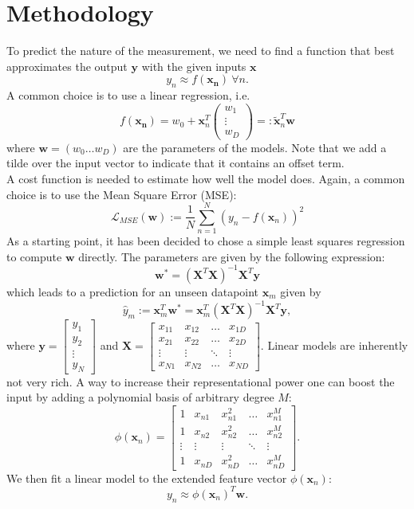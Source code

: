\documentclass[10pt,conference,compsocconf]{IEEEtran}
\newcommand{\xx}{\mathbf{x}}
\newcommand{\yy}{\mathbf{y}}
\newcommand{\ww}{\mathbf{w}}
\newcommand{\XX}{\mathbf{X}}
\newcommand{\Lagr}{\mathcal{L}}
\newcommand{\Lmse}{\Lagr_{MSE}}
\begin{document}
\section{Methodology}
To predict the nature of the measurement, we need to find a function that best approximates the output $\yy$ with the given inputs $\xx$
$$
y_n \approx f(\mathbf{x_n}) \ \forall n.
$$
A common choice is to use a linear regression, i.e.
$$
f(\mathbf{x_n}) = w_0 +  \xx_n^T\begin{pmatrix} w_1 \\ \vdots\\ w_D \end{pmatrix} =: \tilde{\xx}_n^T \ww
$$
where $\ww = (w_0 \ldots w_D)$ are the parameters of the models. Note that we add a tilde over the input vector to indicate that it contains an offset term.\\
A cost function is needed to estimate how well the model does. Again, a common choice is to use the Mean Square Error (MSE):
$$
\Lmse(\ww) := \frac 1N \sum_{n=1}^N \left( y_n -f(\xx_n) \right)^2
$$
As a starting point, it has been decided to chose a simple least squares regression  to compute $\ww$ directly. The parameters are given by the following expression:
$$
\ww^* = (\XX^T\XX)^{-1}\XX^T\yy
$$
which leads to a prediction for an unseen datapoint $\xx_m$ given by
$$
\hat{y}_m := \xx_m^T\ww^*=\xx_m^T(\XX^T\XX)^{-1}\XX^T\yy,
$$
where $\yy = \begin{bmatrix}y_1 \\ y_2 \\ \vdots \\y_N \end{bmatrix}$ and $\XX = \begin{bmatrix}x_{11} & x_{12} & \hdots & x_{1D} \\ x_{21} & x_{22} & \hdots & x_{2D} \\ \vdots & \vdots & \ddots & \vdots \\ x_{N1} & x_{N2} & \hdots & x_{ND} \end{bmatrix}$.
Linear models are inherently not very rich. A way to increase their representational power  one can boost the input by adding a polynomial basis of arbitrary degree $M$:
$$
\phi(\xx_n) = \begin{bmatrix} 1 & x_{n1} & x_{n1}^2 & \hdots & x_{n1}^M \\ 1& x_{n2} & x_{n2}^2 & \hdots & x_{n2}^M \\ \vdots & \vdots & \vdots & \ddots & \vdots \\ 1& x_{nD} & x_{nD}^2 & \hdots & x_{nD}^M \end{bmatrix}.
$$
We then fit a linear model to the extended feature vector $\phi(\xx_n)$:
$$
y_n \approx \phi(\xx_n)^T\ww.
$$
\end{document}
